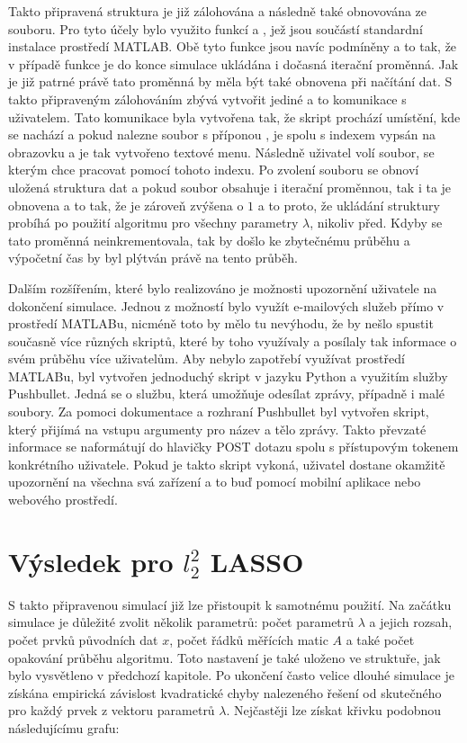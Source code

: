 \documentclass[FM,BP]{tulthesis}
\begin{document}
Takto připravená struktura je již zálohována a následně také obnovována ze souboru. Pro tyto účely bylo využito funkcí  a , jež jsou součástí standardní instalace prostředí MATLAB. Obě tyto funkce jsou navíc podmíněny a to tak, že v případě funkce  je do konce simulace ukládána i dočasná iterační proměnná. Jak je již patrné právě tato proměnná by měla být také obnovena při načítání dat. S takto připraveným zálohováním zbývá vytvořit jediné a to komunikace s uživatelem. Tato komunikace byla vytvořena tak, že skript prochází umístění, kde se nachází a pokud nalezne soubor s příponou , je spolu s indexem vypsán na obrazovku a je tak vytvořeno textové menu. Následně uživatel volí soubor, se kterým chce pracovat pomocí tohoto indexu. Po zvolení souboru se obnoví uložená struktura dat a pokud soubor obsahuje i iterační proměnnou, tak i ta je obnovena a to tak, že je zároveň zvýšena o $1$ a to proto, že ukládání struktury probíhá po použití algoritmu pro všechny parametry $\lambda$, nikoliv před. Kdyby se tato proměnná neinkrementovala, tak by došlo ke zbytečnému průběhu a výpočetní čas by byl plýtván právě na tento průběh.

Dalším rozšířením, které bylo realizováno je možnosti upozornění uživatele na dokončení simulace. Jednou z možností bylo využít e-mailových služeb přímo v prostředí MATLABu, nicméně toto by mělo tu nevýhodu, že by nešlo spustit současně více různých skriptů, které by toho využívaly a posílaly tak informace o svém průběhu více uživatelům. Aby nebylo zapotřebí využívat prostředí MATLABu, byl vytvořen jednoduchý skript v jazyku Python a využitím služby Pushbullet. Jedná se o službu, která umožňuje odesílat zprávy, případně i malé soubory. Za pomoci dokumentace a rozhraní Pushbullet byl vytvořen skript, který přijímá na vstupu argumenty pro název a tělo zprávy. Takto převzaté informace se naformátují do hlavičky POST dotazu spolu s přístupovým tokenem konkrétního uživatele. Pokud je takto skript vykoná, uživatel dostane okamžitě upozornění na všechna svá zařízení a to buď pomocí mobilní aplikace nebo webového prostředí.
\section{Výsledek pro $l_{2}^{2}$ LASSO}
S takto připravenou simulací již lze přistoupit k samotnému použití. Na začátku simulace je důležité zvolit několik parametrů: počet parametrů $\lambda$ a jejich rozsah, počet prvků původních dat $x$, počet řádků měřících matic $A$ a také počet opakování průběhu algoritmu. Toto nastavení je také uloženo ve struktuře, jak bylo vysvětleno v předchozí kapitole. Po ukončení často velice dlouhé simulace je získána empirická závislost kvadratické chyby nalezeného řešení od skutečného pro každý prvek z vektoru parametrů $\lambda$. Nejčastěji lze získat křivku podobnou následujícímu grafu: 
\end{document}
